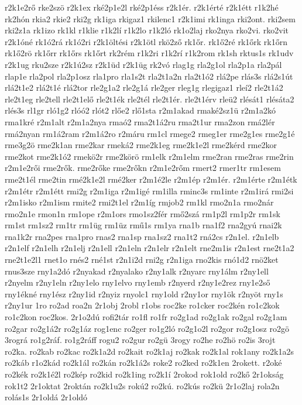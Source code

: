 {r2k1e2rő
rke2szö
r2k1ex
rké2p1e2l
rké2p1éss
r2k1ér.
r2k1érté
r2k1étt
r1k2hé
rk2hón
rkia2
rkie2
rki2g
rk1iga
rkigaz1
rkilenc1
r2k1imi
rk1inga
rki2ont.
rki2sem
rki2z1a
rk1izo
rk1kl
r1klie
r1k2lí
r1k2lo
r1k2ló
rk1o2laj
rko2nya
rko2vi.
rko2vit
r2k1óné
rk1ó2rá
rk1ó2ri
r2k1öltési
r2k1ötl
rkö2ző
rk1őr.
rk1ő2ré
rk1őrk
rk1őrn
rk1ő2rö
rk1őrr
rk1őrs
rk1őrt
rk2rém
r1k2ri
r1k2rí
r1k2rom
rk1sh
rktus1s
rk1udv
r2k1ug
rku2sze
r2k1ú2sz
r2k1üd
r2k1üg
rk2vó
rlag1g
rla2g1ol
rla2p1a
rla2pál
rlap1e
rla2pol
rla2p1osz
rla1pro
rla1s2t
rla2t1a2n
rla2t1ó2
rlá2pe
rlás3s
rlá2s1út
rlá2t1e2
rlá2t1é
rlá2tor
rle2g1a2
rle2g1á
rle2ger
rleg1g
rlegigaz1
rleí2
rle2t1á2
rle2t1eg
rle2tell
rle2t1elő
rle2t1ék
rle2tél
rle2t1ér.
rle2t1érv
rleü2
rlésát1
rlésáta2
rlés3s
rl1gr
rló1g2
rlóó2
rlót2
rlőe2
rlő1sta
r2m1akad
rmaké2sz1ü
r2m1a2kó
rma1kré
r2m1alt
r2m1a2nya
rmaó2
rma2t1á2ru
rma2t1ur
rma2zon
rmá2lér
rmá2nyan
rm1á2ram
r2m1á2ro
r2máru
rm1cl
rmege2
rmeg1er
rme2g1es
rme2g1é
rme3g2ö
rme2k1an
rme2kar
rmeká2
rme2k1eg
rme2k1e2l
rme2kérd
rme2kor
rme2kot
rme2k1ó2
rmekö2r
rme2körö
rm1elk
r2m1elm
rme2ran
rme2ras
rme2rin
r2m1e2rői
rme2rők.
rme2rőke
rme2rőkn
r2m1e2rőm
rmert2
rmer1tr
rm1esem
rme2t1él
rme2tin
rmé2k1e2l
rmé2ker
r2m1é2le
r2m1ép
r2m1ér.
r2m1érte
r2m1étk
r2m1étr
r2m1étt
rmi2g
r2m1iga
r2m1igé
rm1illa
rminc3s
rm1inte
r2m1irá
rmi2si
r2m1isko
r2m1ism
rmite2
rmi2t1el
r2m1íg
rmjob2
rm1kl
rmo2n1a
rmo2nár
rmo2n1e
rmon1n
rm1ope
r2m1ors
rmo1sz2fér
rmő2szá
rm1p2l
rm1p2r
rm1sk
rm1st
rm1sz2
rm1tr
rm1üg
rm1üz
rmű1s
rm1ya
rna1b
rna1f2
rna2gyú
rnai2k
rna1k2r
rna2pes
rna1pro
rnas2
rna1sp
rna1sz2
rna1t2
rná2cs
r2n1el.
r2n1elb
r2n1elf
r2n1elh
r2n1elj
r2n1ell
r2n1eln
r2n1elr
r2n1elt
rne2m1is
r2n1est
rne2t1a2
rne2t1e2l1
rnet1o
rnés2
rné1st
r2n1i2d
rni2g
r2n1iga
rno2kis
rnó1d2
rnö2ket
rnus3sze
rny1a2dó
r2nyakad
r2nyalako
r2ny1alk
r2nyarc
rny1álm
r2ny1ell
r2nyelm
r2ny1eln
r2ny1elo
rny1elvo
rny1emb
r2nyerd
r2ny1e2rez
rny1e2ső
rny1ékné
rny1ész
r2ny1id
r2nyiz
rnyolc1
rny1old
r2ny1or
rny1ök
r2nyöt
rny1s
r2ny1ur
1ro
ro2ad
roa2n
2r1obj
2robl
r1obs
roc2ke
ro1cker
roc2kén
ro1c2kok
ro1c2kon
roc2kos.
2r1o2dú
rofi2tár
ro1fl
ro1fr
ro2g1ad
ro2g1ak
ro2gal
ro2g1am
ro2gar
ro2g1á2r
ro2g1áz
rog1enc
ro2ger
ro1g2ló
ro2g1o2l
ro2gor
ro2g1osz
ro2gö
3rográ
ro1g2ráf.
ro1g2ráff
rogu2
ro2gur
ro2gü
3rogy
ro2he
ro2hö
ro2is
3rojt
ro2ka.
ro2kab
ro2kac
ro2k1a2d
ro2kait
ro2k1aj
ro2kak
ro2k1al
rok1any
ro2k1a2s
ro2káb
r1o2kád
ro2k1ál
ro2kán
ro2k1á2s
roke2
ro2ked
ro2k1en
2rokett.
r2oké
ro2kék
ro2k1é2l
ro2kép
ro2kid
ro2k1ing
ro2k1í
2rokod
rok1old
ro2kő
2r1okság
rok1t2
2r1oktat
2roktán
ro2k1u2s
rokú2
ro2kú.
ro2kús
ro2kü
2r1o2laj
rola2n
rolás1s
2r1oldá
2r1oldó
}
